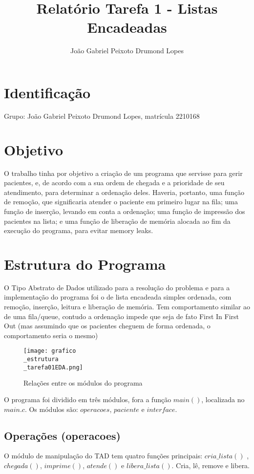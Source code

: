 \documentclass{article}
\title{Relatório Tarefa 1 - Listas Encadeadas}
\author{João Gabriel Peixoto Drumond Lopes}
\begin{document}
\maketitle

\section{Identificação}
Grupo: João Gabriel Peixoto Drumond Lopes, matrícula 2210168

\section{Objetivo}
O trabalho tinha por objetivo a criação de um programa que servisse para gerir pacientes, e, de acordo com a sua ordem de chegada e a prioridade de seu atendimento, para determinar a ordenação deles. Haveria, portanto, uma função de remoção, que significaria atender o paciente em primeiro lugar na fila; uma função de inserção, levando em conta a ordenação; uma função de impressão dos pacientes na lista; e uma função de liberação de memória alocada ao fim da execução do programa, para evitar memory leaks.

\section{Estrutura do Programa}
O Tipo Abstrato de Dados utilizado para a resolução do problema e para a implementação do programa foi o de lista encadeada simples ordenada, com remoção, inserção, leitura e liberação de memória. Tem comportamento similar ao de uma fila/queue, contudo a ordenação impede que seja de fato First In First Out (mas assumindo que os pacientes cheguem de forma ordenada, o comportamento seria o mesmo)

\begin{figure}[h]
  \texttt{[image: grafico\\\_estrutura\\\_tarefa01EDA.png]}
  \caption{Relações entre os módulos do programa}
  \label{fig:model1}
\end{figure}

O programa foi dividido em três módulos, fora a função $main()$, localizada no $main.c$. Os módulos são: $operacoes$, $paciente$ e $interface$. 

\subsection{Operações (operacoes)}
O módulo de manipulação do TAD tem quatro funções principais: $cria\_lista()$ , $chegada()$, $imprime()$, $atende()$ e $libera\_lista()$. Cria, lê, remove e libera.
\end{document}

